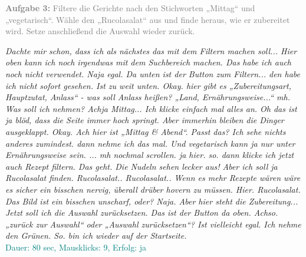 \documentclass[parskip,10pt,abstracton]{scrartcl}
\begin{document}
\begin{appendix}
\textcolor{gray}{
\textbf{Aufgabe 3:} Filtere die Gerichte nach den Stichworten „Mittag“ und „vegetarisch“. Wähle den „Rucolasalat“ aus und finde heraus, wie er zubereitet wird. Setze anschließend die Auswahl wieder zurück.}

\textit{Dachte mir schon, dass ich als nächstes das mit dem Filtern machen soll... Hier oben kann ich noch irgendwas mit dem Suchbereich machen. Das habe ich auch noch nicht verwendet. Naja egal. Da unten ist der Button zum Filtern... den habe ich nicht sofort gesehen. Ist zu weit unten. Okay. hier gibt es „Zubereitungsart, Hauptzutat, Anlass“ - was soll Anlass heißen? „Land, Ernährungsweise...“ mh. Was soll ich nehmen? Achja Mittag... Ich klicke einfach mal alles an. Oh das ist ja blöd, dass die Seite immer hoch springt. Aber immerhin bleiben die Dinger ausgeklappt. Okay. Ach hier ist „Mittag \& Abend“. Passt das? Ich sehe nichts anderes zumindest. dann nehme ich das mal. Und vegetarisch kann ja nur unter Ernährungsweise sein. ... mh nochmal scrollen. ja hier. so. dann klicke ich jetzt auch Rezept filtern. Das geht. Die Nudeln sehen lecker aus! Aber ich soll ja Rucolasalat finden. Rucolasalat.. Rucolasalat.. Wenn es mehr Rezepte wären wäre es sicher ein bisschen nervig, überall drüber hovern zu müssen. Hier. Rucolasalat. Das Bild ist ein bisschen unscharf, oder? Naja. Aber hier steht die Zubereitung... Jetzt soll ich die Auswahl zurücksetzen. Das ist der Button da oben. Achso. „zurück zur Auswahl“ oder „Auswahl zurücksetzen“? Ist vielleicht egal. Ich nehme den Grünen. So. bin ich wieder auf der Startseite.}\\
\textcolor{teal}{Dauer: 80 sec, Mausklicks: 9, Erfolg: ja}

\end{appendix}
\end{document}
